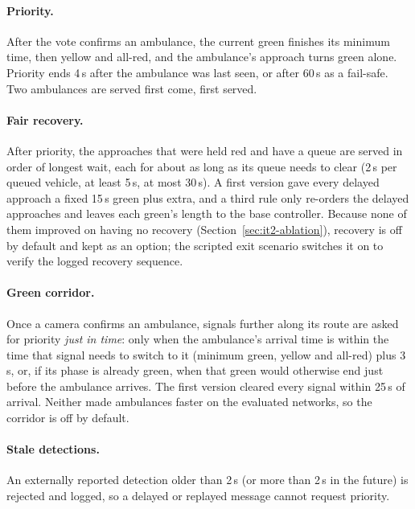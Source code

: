 \paragraph{Priority.} After the vote confirms an ambulance, the current green finishes its minimum time,
then yellow and all-red, and the ambulance's approach turns green alone. Priority ends 4\,s after the
ambulance was last seen, or after 60\,s as a fail-safe. Two ambulances are served first come, first served.
\paragraph{Fair recovery.} After priority, the approaches that were held red and have a queue are served in
order of longest wait, each for about as long as its queue needs to clear (2\,s per queued vehicle, at least
5\,s, at most 30\,s). A first version gave every delayed approach a fixed 15\,s green plus extra, and a third
rule only re-orders the delayed approaches and leaves each green's length to the base controller. Because none of
them improved on having no recovery (Section~\ref{sec:it2-ablation}), recovery is off by default and kept as an
option; the scripted exit scenario switches it on to verify the logged recovery sequence.
\paragraph{Green corridor.} Once a camera confirms an ambulance, signals further along its route are asked for
priority \emph{just in time}: only when the ambulance's arrival time is within the time that signal needs to
switch to it (minimum green, yellow and all-red) plus 3\,s, or, if its phase is already green, when that green
would otherwise end just before the ambulance arrives. The first version cleared every signal within 25\,s of
arrival. Neither made ambulances faster on the evaluated networks, so the corridor is off by default.
\paragraph{Stale detections.} An externally reported detection older than 2\,s (or more than 2\,s in the
future) is rejected and logged, so a delayed or replayed message cannot request priority.

